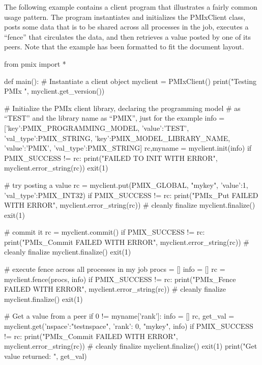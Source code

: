 The following example contains a client program that illustrates a fairly common usage pattern. The program instantiates and initializes the PMIxClient class, posts some data that is to be shared across all processes in the job, executes a “fence” that circulates the data, and then retrieves a value posted by one of its peers. Note that the example has been formatted to fit the document layout.


\pyspecificstart
\begin{codepar}
from pmix import *

def main():
    # Instantiate a client object
    myclient = PMIxClient()
    print("Testing PMIx ", myclient.get_version())

    # Initialize the PMIx client library, declaring the programming model
    # as “TEST” and the library name as “PMIX”, just for the example
    info = [{'key':PMIX_PROGRAMMING_MODEL,
             'value':'TEST', 'val_type':PMIX_STRING},
            {'key':PMIX_MODEL_LIBRARY_NAME,
             'value':'PMIX', 'val_type':PMIX_STRING}]
    rc,myname = myclient.init(info)
    if PMIX_SUCCESS != rc:
        print("FAILED TO INIT WITH ERROR", myclient.error_string(rc))
        exit(1)

    # try posting a value
    rc = myclient.put(PMIX_GLOBAL, "mykey",
                      {'value':1, 'val_type':PMIX_INT32})
    if PMIX_SUCCESS != rc:
        print("PMIx_Put FAILED WITH ERROR", myclient.error_string(rc))
        # cleanly finalize
        myclient.finalize()
        exit(1)

    # commit it
    rc = myclient.commit()
    if PMIX_SUCCESS != rc:
        print("PMIx_Commit FAILED WITH ERROR",
              myclient.error_string(rc))
        # cleanly finalize
        myclient.finalize()
        exit(1)

    # execute fence across all processes in my job
    procs = []
    info = []
    rc = myclient.fence(procs, info)
    if PMIX_SUCCESS != rc:
        print("PMIx_Fence FAILED WITH ERROR", myclient.error_string(rc))
        # cleanly finalize
        myclient.finalize()
        exit(1)

    # Get a value from a peer
    if 0 != myname['rank']:
        info = []
        rc, get_val = myclient.get({'nspace':"testnspace", 'rank': 0},
                                   "mykey", info)
        if PMIX_SUCCESS != rc:
            print("PMIx_Commit FAILED WITH ERROR",
                  myclient.error_string(rc))
            # cleanly finalize
            myclient.finalize()
            exit(1)
        print("Get value returned: ", get_val)


\end{codepar}
